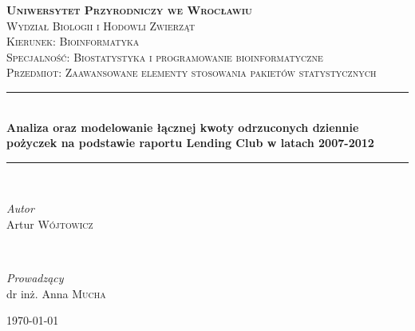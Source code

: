 \documentclass[11pt]{article}
\begin{document}

\begin{titlepage}

	\newcommand{\HRule}{\rule{\linewidth}{0.5mm}}
	
	\center
	
	
	\textsc{\LARGE \textbf{Uniwersytet Przyrodniczy we Wrocławiu}}\\[1cm] 
	
	\textsc{\Large Wydział Biologii i Hodowli Zwierząt}\\[0.5cm] 
	
	\textsc{\large Kierunek: Bioinformatyka}\\[0.5cm] 
	
	\textsc{\large Specjalność: Biostatystyka i programowanie bioinformatyczne}\\[0.5cm]
	
	\textsc{\large Przedmiot: Zaawansowane elementy stosowania pakietów statystycznych}\\[0.5cm]
	
	
	\HRule\\[0.4cm]
	
	{\huge\bfseries Analiza oraz modelowanie łącznej kwoty odrzuconych dziennie pożyczek na podstawie raportu Lending Club w latach 2007-2012}\\[0.4cm] 
	
	\HRule\\[1.5cm]
	
	
	\begin{minipage}{0.4\textwidth}
		\begin{flushleft}
			\large
			\textit{Autor}\\
			Artur \textsc{Wójtowicz}
		\end{flushleft}
	\end{minipage}
	~
	\begin{minipage}{0.4\textwidth}
		\begin{flushright}
			\large
			\textit{Prowadzący}\\
			dr inż. Anna \textsc{Mucha} %
		\end{flushright}
	\end{minipage}
	
	
	\vfill\vfill\vfill
	{\large\today}
	\vfill 
	
\end{titlepage}

\newpage

\tableofcontents

\newpage
\end{document}
